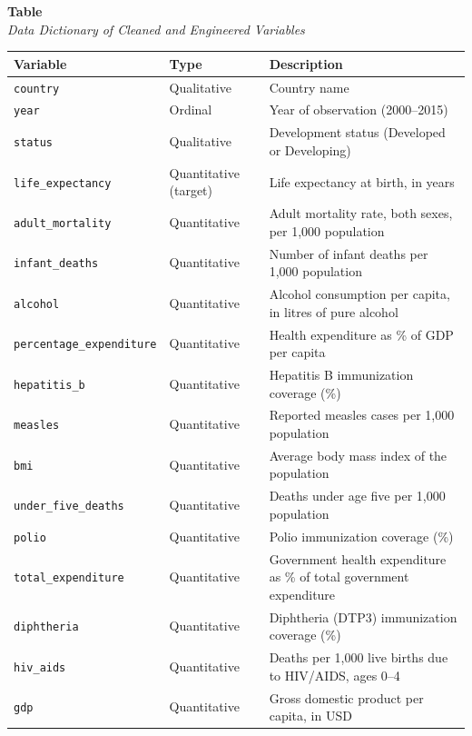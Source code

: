 \documentclass[12pt,a4paper]{article}
\begin{document}
\label{tab:dict}
\noindent\textbf{Table \thetable}\\
\emph{Data Dictionary of Cleaned and Engineered Variables}

\vspace{4pt}
{\singlespacing\footnotesize\renewcommand{\arraystretch}{1.18}
\noindent\begin{tabularx}{\textwidth}{l l X}\toprule
\textbf{Variable} & \textbf{Type} & \textbf{Description}\\\midrule
\texttt{country} & Qualitative & Country name\\
\texttt{year} & Ordinal & Year of observation (2000--2015)\\
\texttt{status} & Qualitative & Development status (Developed or Developing)\\
\texttt{life\_expectancy} & Quantitative (target) & Life expectancy at birth, in years\\
\texttt{adult\_mortality} & Quantitative & Adult mortality rate, both sexes, per 1,000 population\\
\texttt{infant\_deaths} & Quantitative & Number of infant deaths per 1,000 population\\
\texttt{alcohol} & Quantitative & Alcohol consumption per capita, in litres of pure alcohol\\
\texttt{percentage\_expenditure} & Quantitative & Health expenditure as \% of GDP per capita\\
\texttt{hepatitis\_b} & Quantitative & Hepatitis B immunization coverage (\%)\\
\texttt{measles} & Quantitative & Reported measles cases per 1,000 population\\
\texttt{bmi} & Quantitative & Average body mass index of the population\\
\texttt{under\_five\_deaths} & Quantitative & Deaths under age five per 1,000 population\\
\texttt{polio} & Quantitative & Polio immunization coverage (\%)\\
\texttt{total\_expenditure} & Quantitative & Government health expenditure as \% of total government expenditure\\
\texttt{diphtheria} & Quantitative & Diphtheria (DTP3) immunization coverage (\%)\\
\texttt{hiv\_aids} & Quantitative & Deaths per 1,000 live births due to HIV/AIDS, ages 0--4\\
\texttt{gdp} & Quantitative & Gross domestic product per capita, in USD\\

\end{tabularx}}
\end{document}
